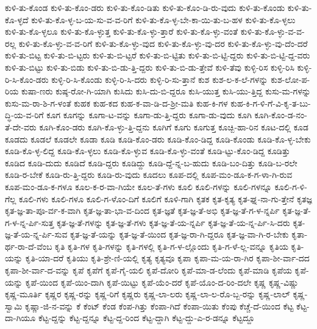 {ಕುಳಿ-ತು-ಕೊಂಡ
ಕುಳಿ-ತು-ಕೊಂ-ಡರು
ಕುಳಿ-ತು-ಕೊಂ-ಡಿತು
ಕುಳಿ-ತು-ಕೊಂ-ಡಿ-ರು-ವುದು
ಕುಳಿ-ತು-ಕೊಂಡು
ಕುಳಿ-ತು-ಕೊ-ಳ್ಳದೆ
ಕುಳಿ-ತು-ಕೊ-ಳ್ಳ-ಬ-ಯ-ಸು-ವ-ವ-ರಿಗೆ
ಕುಳಿ-ತು-ಕೊ-ಳ್ಳ-ಬೇ-ಕಾ-ಯಿ-ತು-ಬ-ಹಳ
ಕುಳಿ-ತು-ಕೊ-ಳ್ಳಲು
ಕುಳಿ-ತು-ಕೊ-ಳ್ಳಲೂ
ಕುಳಿ-ತು-ಕೊ-ಳ್ಳುತ್ತ
ಕುಳಿ-ತು-ಕೊ-ಳ್ಳು-ತ್ತಾರೆ
ಕುಳಿ-ತು-ಕೊ-ಳ್ಳು-ವಂತೆ
ಕುಳಿ-ತು-ಕೊ-ಳ್ಳು-ವ-ವ-ರಲ್ಲ
ಕುಳಿ-ತು-ಕೊ-ಳ್ಳು-ವ-ವ-ರಿಗೆ
ಕುಳಿ-ತು-ಕೊ-ಳ್ಳು-ವುದ
ಕುಳಿ-ತು-ಕೊ-ಳ್ಳು-ವು-ದರ
ಕುಳಿ-ತು-ಕೊ-ಳ್ಳು-ವು-ದೆಂ-ದರೆ
ಕುಳಿ-ತು-ಬಿಟ್ಟ
ಕುಳಿ-ತು-ಬಿ-ಟ್ಟರು
ಕುಳಿ-ತು-ಬಿ-ಟ್ಟರೆ
ಕುಳಿ-ತು-ಬಿ-ಟ್ಟಿತು
ಕುಳಿ-ತು-ಬಿ-ಟ್ಟಿ-ದ್ದರು
ಕುಳಿ-ತು-ಬಿ-ಟ್ಟಿ-ದ್ದ-ವರು
ಕುಳಿ-ತು-ಬಿಟ್ಟು
ಕುಳಿ-ತು-ಬಿಡು
ಕುಳಿ-ತು-ಬಿ-ಡು-ತ್ತಿ-ದ್ದರು
ಕುಳಿ-ತು-ಬಿ-ಡು-ತ್ತೇವೆ
ಕುಳಿ-ತೆವು
ಕುಳ್ಳಿ-ರಿಸ
ಕುಳ್ಳಿ-ರಿಸಿ
ಕುಳ್ಳಿ-ರಿ-ಸಿ-ಕೊಂ-ಡರು
ಕುಳ್ಳಿ-ರಿ-ಸಿ-ಕೊಂಡು
ಕುಳ್ಳಿ-ರಿ-ಸಿ-ದರು
ಕುಳ್ಳಿ-ರಿ-ಸು-ತ್ತಾನೆ
ಕುಶ
ಕುಶ-ಲ-ಕ-ಲೆ-ಗಳನ್ನು
ಕುಶ-ಲೋ-ಪ-ರಿಯ
ಕುಷಾ-ಣರು
ಕುಷ್ಠ-ರೋ-ಗಿ-ಯಾಗಿ
ಕುಸಿದು
ಕುಸಿ-ದು-ಬಿ-ದ್ದರೂ
ಕುಸಿ-ಯುತ್ತ
ಕುಸಿ-ಯು-ತ್ತಿದ್ದ
ಕುಸು-ಮ-ಗಳನ್ನು
ಕುಸು-ಮ-ರಾ-ಶಿ-ಗ-ಳಂತೆ
ಕುಹಕ
ಕುಹ-ಕದ
ಕುಹ-ಕ-ವಾ-ಡಿ-ದ-ಶ್ರೀ-ಮತಿ
ಕುಹ-ಕಿ-ಗಳ
ಕುಹ-ಕಿ-ಗ-ಳಿ-ಗೆ-ವಿ-ಕೃ-ತ-ಬು-ದ್ಧಿ-ಯ-ವ-ರಿಗೆ
ಕೂಗ
ಕೂಗನ್ನು
ಕೂಗಾ-ಟ-ವನ್ನು
ಕೂಗಾ-ಡು-ತ್ತಿ-ದ್ದರು
ಕೂಗಾ-ಡು-ವುದು
ಕೂಗಿ
ಕೂಗಿ-ಕೊಂ-ಡ-ನಂ-ತೆ-ದೇ-ವರು
ಕೂಗಿ-ಕೊಂ-ಡರು
ಕೂಗಿ-ಕೊ-ಳ್ಳು-ತ್ತಿ-ದ್ದನು
ಕೂಗಿಗೆ
ಕೂಗು
ಕೂಗುತ್ತ
ಕೂಚ್ಬಿ-ಹಾ-ರಿನ
ಕೂಟ-ದಲ್ಲಿ
ಕೂಡ
ಕೂಡದು
ಕೂಡಲೆ
ಕೂಡಲೇ
ಕೂಡಾ
ಕೂಡಿ
ಕೂಡಿ-ಕೊಂ-ಡರು
ಕೂಡಿ-ಕೊಂ-ಡಿದ್ದ
ಕೂಡಿ-ಕೊಂಡು
ಕೂಡಿ-ಕೊ-ಳ್ಳ-ಬೇಕು
ಕೂಡಿ-ಕೊ-ಳ್ಳ-ಲಿದ್ದ
ಕೂಡಿ-ಕೊ-ಳ್ಳಲು
ಕೂಡಿ-ಕೊ-ಳ್ಳುವ
ಕೂಡಿ-ಕೊ-ಳ್ಳು-ವಂತೆ
ಕೂಡಿ-ಟ್ಟು-ಕೊಂ-ಡಿದ್ದ
ಕೂಡಿತ್ತು
ಕೂಡಿದ
ಕೂಡಿ-ದುದು
ಕೂಡಿದೆ
ಕೂಡಿ-ದ್ದರು
ಕೂಡಿದ್ದು
ಕೂಡಿ-ದ್ದೆ-ನ್ನ-ಬ-ಹುದು
ಕೂಡಿ-ಬಂ-ದಿತ್ತು
ಕೂಡಿ-ಬ-ರಲೇ
ಕೂಡಿ-ರ-ಬೇಕೆ
ಕೂಡಿ-ರು-ತ್ತಿ-ದ್ದರು
ಕೂಡಿ-ರು-ವುದು
ಕೂದಲು
ಕೂಪ-ದಲ್ಲಿ
ಕೂಪ-ಮಂ-ಡೂ-ಕ-ಗ-ಳಾ-ಗಿ-ರುವ
ಕೂಪ-ಮಂ-ಡೂ-ಕ-ಗಳೂ
ಕೂಲ-ಕ-ರ-ವಾ-ಗಿಯೇ
ಕೂಲ-ತೆ-ಗಳು
ಕೂಲಿ
ಕೂಲಿ-ಗಳನ್ನು
ಕೂಲಿ-ಗಳನ್ನೂ
ಕೂಲಿ-ಗ-ಳಿ-ಗೆಲ್ಲ
ಕೂಲಿ-ಗಳು
ಕೂಲಿ-ಗಳೂ
ಕೂಲಿ-ಗ-ಳೊಂ-ದಿಗೆ
ಕೂಲಿಗೆ
ಕೂಳಿ-ಗಾಗಿ
ಕೃತಕ
ಕೃತ-ಕೃತ್ಯ
ಕೃತ-ಘ್ನ-ನಾ-ಗು-ತ್ತೇನೆ
ಕೃತಜ್ಞ
ಕೃತ-ಜ್ಞ-ತಾ-ಪೂ-ರ್ವ-ಕ-ವಾಗಿ
ಕೃತ-ಜ್ಞ-ತಾ-ಭಾ-ವ-ದಿಂದ
ಕೃತ-ಜ್ಞತೆ
ಕೃತ-ಜ್ಞ-ತೆ-ಅಭಿ
ಕೃತ-ಜ್ಞ-ತೆ-ಗ-ಳ-ನ್ನರ್ಪಿ
ಕೃತ-ಜ್ಞ-ತೆ-ಗ-ಳ-ನ್ನ-ರ್ಪಿ-ಸುತ್ತ
ಕೃತ-ಜ್ಞ-ತೆ-ಗಳನ್ನು
ಕೃತ-ಜ್ಞ-ತೆ-ಗಳು
ಕೃತ-ಜ್ಞ-ತೆ-ಯ-ನ್ನರ್ಪಿ
ಕೃತ-ಜ್ಞ-ತೆ-ಯ-ನ್ನ-ರ್ಪಿ-ಸಿ-ದರು
ಕೃತ-ಜ್ಞ-ತೆ-ಯ-ನ್ನ-ರ್ಪಿ-ಸುವ
ಕೃತ-ಜ್ಞ-ತೆ-ಯನ್ನು
ಕೃತ-ಜ್ಞ-ತೆ-ಯಿಂದ
ಕೃತ-ಜ್ಞ-ರಾ-ಗಿ-ದ್ದರೂ
ಕೃತ-ಜ್ಞ-ವಾ-ಗಿ-ರ-ಬೇಕು
ಕೃತಾ-ರ್ಥ-ರಾ-ದೆ-ವೆಂಬ
ಕೃತಿ
ಕೃತಿ-ಗಳ
ಕೃತಿ-ಗಳನ್ನು
ಕೃತಿ-ಗಳಲ್ಲಿ
ಕೃತಿ-ಗ-ಳ-ಲ್ಲೊಂದು
ಕೃತಿ-ಗ-ಳೆ-ಲ್ಲ-ವನ್ನೂ
ಕೃತಿಯ
ಕೃತಿ-ಯನ್ನು
ಕೃತಿ-ಯಾ-ದರೆ
ಕೃತಿಯು
ಕೃತಿ-ಶ್ರೇ-ಣಿ-ಯಲ್ಲಿ
ಕೃತ್ಯ
ಕೃತ್ಯವೂ
ಕೃಪಾ
ಕೃಪಾ-ಮ-ಯ-ರಾ-ಗಿರ
ಕೃಪಾ-ಶೀ-ರ್ವಾ-ದದ
ಕೃಪಾ-ಶೀ-ರ್ವಾ-ದ-ವನ್ನು
ಕೃಪೆ
ಕೃಪೆಗೆ
ಕೃಪೆ-ಗೈ-ಯಲಿ
ಕೃಪೆ-ದೋರಿ
ಕೃಪೆ-ಮಾ-ಡ-ಲೆಂದು
ಕೃಪೆ-ಮಾಡಿ
ಕೃಪೆಯ
ಕೃಪೆ-ಯನ್ನು
ಕೃಪೆ-ಯಿಂದ
ಕೃಪೆ-ಯಿಂ-ದಾಗಿ
ಕೃಪೆ-ಯಿಟ್ಟು
ಕೃಪೆ-ಯೆಂ-ದರೆ
ಕೃಪೆ-ಯೊಂ-ದ-ರಿಂ-ದಲೇ
ಕೃಷ್ಣ
ಕೃಷ್ಣ-ವಿಷ್ಣು
ಕೃಷ್ಣ-ಮೂರ್ತಿ
ಕೃಷ್ಣರ
ಕೃಷ್ಣ-ರನ್ನು
ಕೃಷ್ಣ-ರಿಗೆ
ಕೃಷ್ಣರು
ಕೃಷ್ಣ-ಲಾ-ಲರು
ಕೃಷ್ಣ-ಲಾ-ಲ-ರೊ-ಬ್ಬ-ರನ್ನು
ಕೃಷ್ಣ-ಲಾಲ್
ಕೃಷ್ಣ-ಸ್ವಾಮಿ
ಕೃಷ್ಣಾ-ಜಿ-ನ-ವನ್ನು
ಕೆ
ಕೆಂಟ್
ಕೆಂಡ
ಕೆಂಪ-ಗಿತ್ತು
ಕೆಂಪಾ-ಗಿದೆ
ಕೆಂಪಾ-ಯಿತು
ಕೆಂಪು
ಕೆಚ್ಚೆ-ದೆ-ಯಿಂದ
ಕೆಟ್ಟ
ಕೆಟ್ಟ-ದಾ-ಗಿಯೂ
ಕೆಟ್ಟ-ದ್ದನ್ನು
ಕೆಟ್ಟ-ದ್ದನ್ನೂ
ಕೆಟ್ಟ-ದ್ದ-ರಿಂದ
ಕೆಟ್ಟ-ದ್ದಾಗಿ
ಕೆಟ್ಟ-ದ್ದು-ಎ-ರ-ಡನ್ನೂ
ಕೆಟ್ಟದ್ದೂ
}
